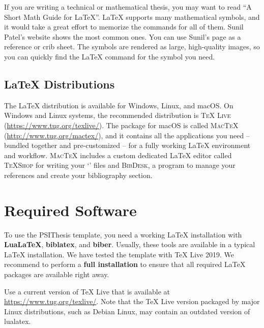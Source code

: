 If you are writing a technical or mathematical thesis, you may want to read \enquote{A Short Math Guide for LaTeX}.
LaTeX supports many mathematical symbols, and it would take a great effort to memorize the commands for all of them. Sunil Patel's website shows the most common ones.
You can use Sunil's page as a reference or crib sheet. The symbols are rendered as large, high-quality images, so you can quickly find the LaTeX command for the symbol you need.

\subsection{LaTeX Distributions}

The LaTeX distribution is available for Windows, Linux, and macOS\@.
On Windows and Linux systems, the recommended distribution is \textsc{TeX Live} (\url{https://www.tug.org/texlive/}).
The package for macOS is called \textsc{MacTeX} (\url{http://www.tug.org/mactex/}), and it contains all the applications you need -- bundled together and pre-customized -- for a fully working LaTeX environment and workflow.
\textsc{MacTeX} includes a custom dedicated LaTeX editor called \textsc{TeXShop} for writing your `' files and \textsc{BibDesk}, a program to manage your references and create your bibliography section.



\section{Required Software}
\label{sec:requirements}

To use the PSIThesis template, you need a working LaTeX installation with \textbf{LuaLaTeX}, \textbf{biblatex}, and \textbf{biber}.%
Usually, these tools are available in a typical LaTeX installation. We have tested the template with TeX Live 2019. We recommend to perform a \textbf{full installation} to ensure that all required LaTeX packages are available right away.

Use a current version of TeX Live that is available at \url{https://www.tug.org/texlive/}. Note that the TeX Live version packaged by major Linux distributions, such as Debian Linux, may contain an outdated version of lualatex.


